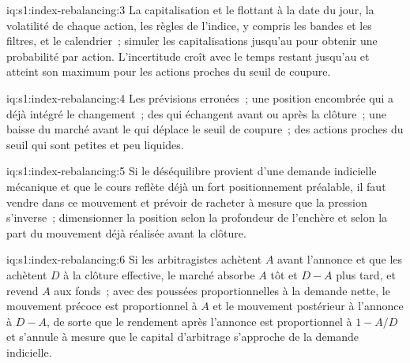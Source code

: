 \begin{solution}{iq:s1:index-rebalancing:3}
La capitalisation et le flottant à la date du jour, la volatilité de chaque action, les règles de l'indice, y compris les bandes et les filtres, et le calendrier~; simuler les capitalisations jusqu'au
 pour obtenir une probabilité par action. L'incertitude croît avec le temps restant jusqu'au  et atteint son maximum pour les actions proches du seuil de coupure.
\end{solution}

\begin{solution}{iq:s1:index-rebalancing:4}
Les prévisions erronées~; une position encombrée qui a déjà intégré le changement~; des  qui échangent avant ou après la clôture~; une baisse du marché avant le 
qui déplace le seuil de coupure~; des actions proches du seuil qui sont petites et peu liquides.
\end{solution}

\begin{solution}{iq:s1:index-rebalancing:5}
Si le déséquilibre provient d'une demande indicielle mécanique et que le cours reflète déjà un fort positionnement préalable, il faut vendre dans ce mouvement et prévoir de racheter à mesure que la pression s'inverse~;
dimensionner la position selon la profondeur de l'enchère et selon la part du mouvement déjà réalisée avant la clôture.
\end{solution}

\begin{solution}{iq:s1:index-rebalancing:6}
Si les arbitragistes achètent $A$ avant l'annonce et que les  achètent $D$ à la clôture effective, le marché absorbe $A$ tôt et $D - A$ plus tard, et revend $A$
aux fonds~; avec des poussées proportionnelles à la demande nette, le mouvement précoce est proportionnel à $A$ et le mouvement postérieur à l'annonce à $D - A$, de sorte que le rendement
après l'annonce est proportionnel à $1 - A/D$ et s'annule à mesure que le capital d'arbitrage s'approche de la demande indicielle.
\end{solution}
